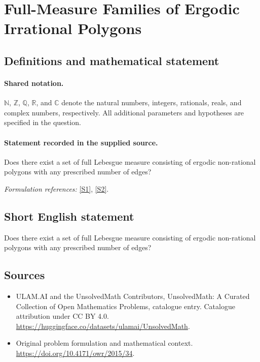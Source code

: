 \documentclass[11pt]{article}
\newcommand{\sref}[2]{\hyperlink{source:#1:#2}{[S#2]}}
\begin{document}
\section{Full-Measure Families of Ergodic Irrational Polygons}\label{statement}

\subsection{Definitions and mathematical statement}

\paragraph{Shared notation.}$\mathbb N$, $\mathbb Z$, $\mathbb Q$, $\mathbb R$, and $\mathbb C$ denote the natural numbers, integers, rationals, reals, and complex numbers, respectively. All additional parameters and hypotheses are specified in the question.


\paragraph{Statement recorded in the supplied source.}
Does there exist a set of full Lebesgue measure consisting of ergodic non-rational polygons with any prescribed number of edges?
\par\smallskip\textit{Formulation references:} \sref{statement}{1}, \sref{statement}{2}.
\subsection{Short English statement}
Does there exist a set of full Lebesgue measure consisting of ergodic non-rational polygons with any prescribed number of edges?
\subsection{Sources}
\begin{itemize}
\item[\hypertarget{source:statement:1}{S1}] ULAM.AI and the UnsolvedMath Contributors, UnsolvedMath: A Curated Collection of Open Mathematics Problems, catalogue entry. Catalogue attribution under CC BY 4.0.
\url{https://huggingface.co/datasets/ulamai/UnsolvedMath}.
\item[\hypertarget{source:statement:2}{S2}] Original problem formulation and mathematical context.
\url{https://doi.org/10.4171/owr/2015/34}.
\end{itemize}
\label{end:statement}
\end{document}
